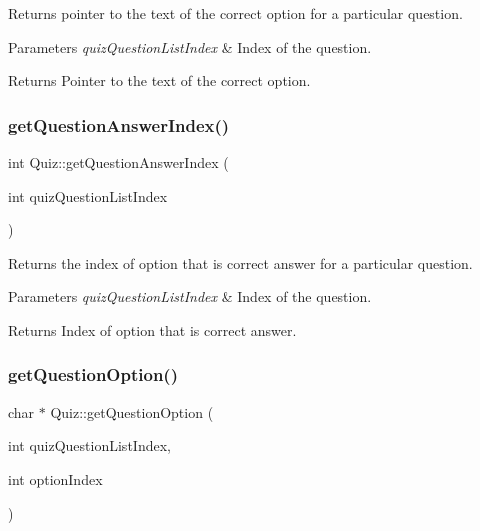 Returns pointer to the text of the correct option for a particular question. 


\begin{DoxyParams}{Parameters}
{\em quiz\+Question\+List\+Index} & Index of the question.\\
\hline
\end{DoxyParams}
\begin{DoxyReturn}{Returns}
Pointer to the text of the correct option. 
\end{DoxyReturn}
\mbox{\label{class_quiz_a177966a2aa25acd1ca88a293f6b1ad43}} 
\subsubsection{\texorpdfstring{getQuestionAnswerIndex()}{getQuestionAnswerIndex()}}
{\footnotesize\ttfamily int Quiz\+::get\+Question\+Answer\+Index (\begin{DoxyParamCaption}\item[{int}]{quiz\+Question\+List\+Index }\end{DoxyParamCaption})}



Returns the index of option that is correct answer for a particular question. 


\begin{DoxyParams}{Parameters}
{\em quiz\+Question\+List\+Index} & Index of the question.\\
\hline
\end{DoxyParams}
\begin{DoxyReturn}{Returns}
Index of option that is correct answer. 
\end{DoxyReturn}
\mbox{\label{class_quiz_a87bca63da7123d0c2daca97e57d4032a}} 
\subsubsection{\texorpdfstring{getQuestionOption()}{getQuestionOption()}}
{\footnotesize\ttfamily char $\ast$ Quiz\+::get\+Question\+Option (\begin{DoxyParamCaption}\item[{int}]{quiz\+Question\+List\+Index,  }\item[{int}]{option\+Index }\end{DoxyParamCaption})}



